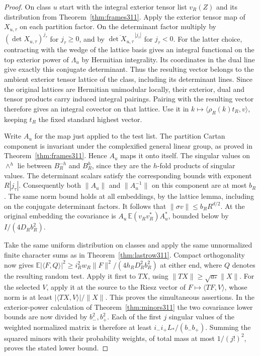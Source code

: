 \documentclass[a4paper,11pt]{article}
\theoremstyle{definition}
\theoremstyle{remark}
\numberwithin{equation}{section}
\begin{document}
\begin{proof}
On class \(u\) start with the integral exterior tensor list
\(v_R(Z)\) and its distribution from Theorem~\ref{thm:frames311}.
Apply the exterior tensor map of \(X_{u,\tau}\) on each
partition factor. On the determinant factor multiply by
\((\det X_{u,\tau})^{j_\tau}\) for \(j_\tau\ge0\), and by
\(\overline{\det X_{u,\tau}}^{\,|j_\tau|}\) for \(j_\tau<0\).
For the latter choice, contracting with the wedge of the
lattice basis gives an integral functional on the top
exterior power of \(\Lambda_u\) by Hermitian integrality.
Its coordinates in the dual line give exactly this conjugate
determinant. Thus the resulting vector belongs to the ambient
exterior tensor lattice of the class, including its determinant
lines. Since the original lattices are Hermitian unimodular
locally, their exterior, dual and tensor products carry
induced integral pairings. Pairing with the resulting vector
therefore gives an integral covector on that lattice. Use it in
\(k\mapsto\langle\rho_R(k)t_R,v\rangle\), keeping \(t_R\)
the fixed standard highest vector.

Write \(A_u\) for the map just applied to the test list.
The partition Cartan component is invariant under the
complexified general linear group, as proved in
Theorem~\ref{thm:frames311}. Hence \(A_u\) maps it onto
itself. The singular values on \(\wedge^h\) lie between
\(B_R^{-h}\) and \(B_R^h\), since they are the \(h\)-fold
products of singular values. The determinant scalars satisfy
the corresponding bounds with exponent \(R|j_\tau|\).
Consequently both \(\|A_u\|\) and \(\|A_u^{-1}\|\) on this
component are at most \(b_R\). The same norm bound holds
at all embeddings, by the lattice lemma, including on
the conjugate determinant factors. It follows that
\(\|\sigma v\|\le b_R R^{d/2}\). At the original embedding
the covariance is \(A_u\,{\mathbb E}(v_Rv_R^*)A_u^*\),
bounded below by \(I/(4D_R b_R^2)\).

Take the same uniform distribution on classes and apply the
same unnormalized finite character sums as in
Theorem~\ref{thm:lastrow311}. Compact orthogonality now gives
\(\mathbb E|\langle F,Q\rangle|^2\ge
i_R^2 w_R\|F\|^2/(4h_R D_R^2 b_R^2)\) at either end, where
\(Q\) denotes the resulting random test. Apply it first to
\(TX\), using \(\|TX\|\ge\sqrt{a_*}\|X\|\). For the selected
\(V\), apply it at the source to the Riesz vector of
\(F\mapsto\langle TF,V\rangle\), whose norm is at least
\(|\langle TX,V\rangle|/\|X\|\). This proves the simultaneous
assertions. In the exterior-power calculation of
Theorem~\ref{thm:minors311} the two covariance lower bounds
are now divided by \(b_-^2,b_+^2\). Each of the first \(j\)
singular values of the weighted normalized matrix is therefore
at least \(i_-i_+L_*/(b_-b_+)\). Summing the squared minors
with their probability weights, of total mass at most \(1/(j!)^2\),
proves the stated lower bound.


\end{proof}
\end{document}
